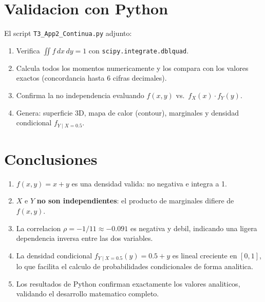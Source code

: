 \documentclass[12pt,a4paper]{article}
\begin{document}
\section{Validacion con Python}

El script \texttt{T3\_App2\_Continua.py} adjunto:
\begin{enumerate}
  \item Verifica $\iint f\,dx\,dy=1$ con \texttt{scipy.integrate.dblquad}.
  \item Calcula todos los momentos numericamente y los compara con los
        valores exactos (concordancia hasta 6 cifras decimales).
  \item Confirma la no independencia evaluando $f(x,y)$ vs.\
        $f_X(x)\cdot f_Y(y)$.
  \item Genera: superficie 3D, mapa de calor (contour), marginales y
        densidad condicional $f_{Y\mid X=0.5}$.
\end{enumerate}

\section{Conclusiones}

\begin{enumerate}
  \item $f(x,y)=x+y$ es una densidad valida: no negativa e integra a 1.
  \item $X$ e $Y$ \textbf{no son independientes}: el producto de marginales
        difiere de $f(x,y)$.
  \item La correlacion $\rho=-1/11\approx -0.091$ es negativa y debil,
        indicando una ligera dependencia inversa entre las dos variables.
  \item La densidad condicional $f_{Y\mid X=0.5}(y)=0.5+y$ es lineal
        creciente en $[0,1]$, lo que facilita el calculo de probabilidades
        condicionales de forma analitica.
  \item Los resultados de Python confirman exactamente los valores
        analiticos, validando el desarrollo matematico completo.
\end{enumerate}
\end{document}
